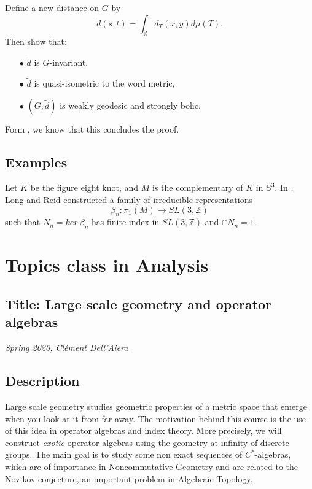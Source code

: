 Define a new distance on $G$ by
\[\tilde d (s,t) = \int_{\mathbb X} d_T(x,y) d\mu (T).\]
Then show that:
\begin{itemize}
\item[$\bullet$] $\tilde d$ is $G$-invariant,
\item[$\bullet$] $\tilde d$ is quasi-isometric to the word metric,
\item[$\bullet$] $(G,\tilde d)$ is weakly geodesic and strongly bolic.
\end{itemize}
Form \cite{mineyev2002baum}, we know that this concludes the proof.

\subsection{Examples}

Let $K$ be the figure eight knot, and $M$ is the complementary of $K$ in $\mathbb S^3$. In \cite{long2011small}, Long and Reid constructed a family of irreducible representations 
\[\beta_n : \pi_1 (M) \rightarrow SL(3,\mathbb Z)\]
such that $N_n = ker \ \beta_n $ has finite index in $SL(3,\mathbb Z)$ and $\cap N_n = 1$.\\


\newpage

\section{Topics class in Analysis}

\subsection*{Title: Large scale geometry and operator algebras}
\textit{Spring 2020, Cl\'ement Dell'Aiera}
\subsection*{Description} 
Large scale geometry studies geometric properties of a metric space that emerge when you look at it from far away. The motivation behind this course is the use of this idea in operator algebras and index theory. More precisely, we will construct \textit{exotic} operator algebras using the geometry at infinity of discrete groups. The main goal is to study some non exact sequences of $C^*$-algebras, which are of importance in Noncommutative Geometry and are related to the Novikov conjecture, an important problem in Algebraic Topology.

